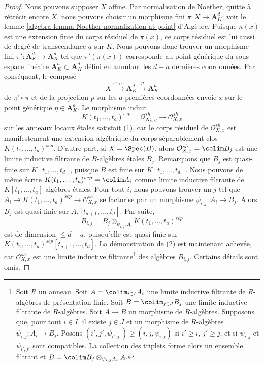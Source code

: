 \begin{proof}
Nous pouvons supposer $X$ affine. Par normalisation de Noether, quitte à
rétrécir encore $X$, nous pouvons choisir un morphisme fini
$\pi : X \to \mathbf{A}^d_K$; voir le
lemme \ref{algebra-lemma-Noether-normalization-at-point} d'Algèbre.
Puisque $\kappa(x)$ est une extension finie du corps résiduel de $\pi(x)$,
ce corps résiduel est lui aussi de degré de transcendance $a$ sur $K$.
Nous pouvons donc trouver un morphisme fini $\pi' : \mathbf{A}^d_K \to \mathbf{A}^d_K$
tel que $\pi'(\pi(x))$ corresponde au point générique du sous-espace
linéaire $\mathbf{A}^a_K \subset \mathbf{A}^d_K$ défini en annulant
les $d - a$ dernières coordonnées. Par conséquent, le composé
$$
X \xrightarrow{\pi' \circ \pi} \mathbf{A}^d_K \xrightarrow{p} \mathbf{A}^a_K
$$
de $\pi' \circ \pi$ et de la projection $p$ sur les $a$ premières coordonnées
envoie $x$ sur le point générique $\eta \in \mathbf{A}^a_K$. Le morphisme induit
$$
K(t_1, \ldots, t_a)^{sep} =
\mathcal{O}_{\mathbf{A}^a_k, \eta}^{sh}
\longrightarrow \mathcal{O}_{X, x}^{sh}
$$
sur les anneaux locaux étales satisfait (1), car le corps résiduel
de $\mathcal{O}_{X, x}^{sh}$ est manifestement une extension algébrique du corps
séparablement clos $K(t_1, \ldots, t_a)^{sep}$. D'autre part, si $X = \Spec(B)$,
alors $\mathcal{O}_{X, x}^{sh} = \colim B_j$ est une limite inductive filtrante
de $B$-algèbres étales $B_j$. Remarquons que $B_j$ est quasi-finie sur
$K[t_1, \ldots, t_d]$, puisque $B$ est finie sur $K[t_1, \ldots, t_d]$.
Nous pouvons de même écrire
$K(t_1, \ldots, t_a)^{sep} = \colim A_i$ comme limite inductive filtrante
de $K[t_1, \ldots, t_a]$-algèbres étales. Pour tout $i$, nous pouvons
trouver un $j$ tel que
$A_i \to K(t_1, \ldots, t_a)^{sep} \to \mathcal{O}_{X, x}^{sh}$
se factorise par un morphisme $\psi_{i, j} : A_i \to B_j$. Alors $B_j$ est quasi-finie
sur $A_i[t_{a + 1}, \ldots, t_d]$. Par suite,
$$
B_{i, j} = B_j \otimes_{\psi_{i, j}, A_i} K(t_1, \ldots, t_a)^{sep}
$$
est de dimension $\leq d - a$, puisqu'elle est quasi-finie sur
$K(t_1, \ldots, t_a)^{sep}[t_{a + 1}, \ldots, t_d]$.
La démonstration de (2) est maintenant achevée, car $\mathcal{O}_{X, x}^{sh}$ est une
limite inductive filtrante\footnote{Soit $R$ un anneau.
Soit $A = \colim_{i \in I} A_i$
une limite inductive filtrante de $R$-algèbres de présentation finie.
Soit $B = \colim_{j \in J} B_j$ une limite inductive filtrante de $R$-algèbres.
Soit $A \to B$ un morphisme de $R$-algèbres.
Supposons que, pour tout $i \in I$, il existe $j \in J$ et un morphisme de $R$-algèbres
$\psi_{i, j} : A_i \to B_j$.
Posons $(i', j', \psi_{i', j'}) \geq (i, j, \psi_{i, j})$ si
$i' \geq i$, $j' \geq j$, et si $\psi_{i, j}$ et $\psi_{i', j'}$
sont compatibles. La collection des triplets forme alors un
ensemble filtrant et $B = \colim B_j \otimes_{\psi_{i, j} A_i} A$.}
des algèbres $B_{i, j}$. Certains détails sont omis.
\end{proof}

